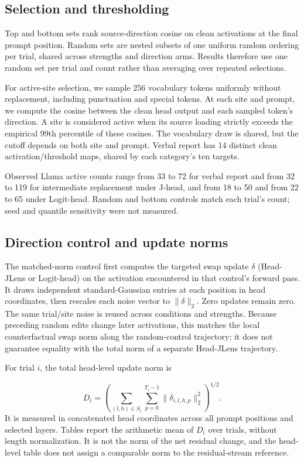 \documentclass[11pt,a4paper]{article}
\begin{document}
\subsection{Selection and thresholding}\label{sec:S3.2}

Top and bottom sets rank source-direction cosine on clean activations at the final prompt position. Random sets are nested subsets of one uniform random ordering per trial, shared across strengths and direction arms. Results therefore use one random set per trial and count rather than averaging over repeated selections.

For active-site selection, we sample 256 vocabulary tokens uniformly without replacement, including punctuation and special tokens. At each site and prompt, we compute the cosine between the clean head output and each sampled token's direction. A site is considered active when its source loading strictly exceeds the empirical 99th percentile of these cosines. The vocabulary draw is shared, but the cutoff depends on both site and prompt. Verbal report has 14 distinct clean activation/threshold maps, shared by each category's ten targets.

Observed Llama active counts range from 33 to 72 for verbal report and from 32 to 119 for intermediate replacement under J-head, and from 18 to 50 and from 22 to 65 under Logit-head. Random and bottom controls match each trial's count; seed and quantile sensitivity were not measured.

\subsection{Direction control and update norms}\label{sec:S3.3}

The matched-norm control first computes the targeted swap update $\delta$ (Head-JLens or Logit-head) on the activation encountered in that control's forward pass. It draws independent standard-Gaussian entries at each position in head coordinates, then rescales each noise vector to $\|\delta\|_2$. Zero updates remain zero. The same trial/site noise is reused across conditions and strengths. Because preceding random edits change later activations, this matches the local counterfactual swap norm along the random-control trajectory; it does not guarantee equality with the total norm of a separate Head-JLens trajectory.

For trial $i$, the total head-level update norm is

\[
D_i=\left(\sum_{(l,h)\in S_i}\sum_{p=0}^{T_i-1}
\|\delta_{i,l,h,p}\|_2^2\right)^{1/2}.
\]
It is measured in concatenated head coordinates across all prompt positions and selected layers. Tables report the arithmetic mean of $D_i$ over trials, without length normalization. It is not the norm of the net residual change, and the head-level table does not assign a comparable norm to the residual-stream reference.
\end{document}
